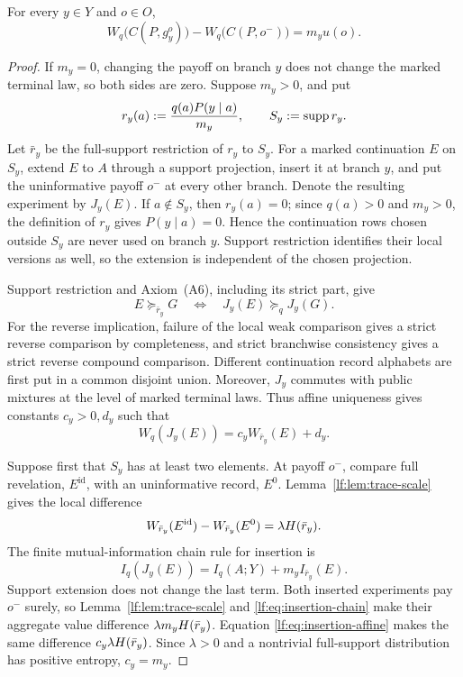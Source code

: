 \begin{lemma}\label{lf:lem:branch-increment}
For every $y\in Y$ and $o\in O$,
\begin{equation}
W_q\bigl(C(P,g_y^o)\bigr)
-W_q\bigl(C(P,o^-)\bigr)=m_y u(o).
\label{lf:eq:branch-increment}
\end{equation}
\end{lemma}

\begin{proof}
If $m_y=0$, changing the payoff on branch $y$ does not change the marked
terminal law, so both sides are zero.  Suppose $m_y>0$, and put
\[
r_y(a):=\frac{q(a)P(y\mid a)}{m_y},
\qquad
S_y:=\operatorname{supp} r_y.
\]
Let $\bar r_y$ be the full-support restriction of $r_y$ to $S_y$.  For a
marked continuation $E$ on $S_y$, extend $E$ to $A$ through a support
projection, insert it at branch $y$, and put the uninformative payoff $o^-$ at
every other branch.  Denote the resulting experiment by $J_y(E)$.  If
$a\notin S_y$, then $r_y(a)=0$; since $q(a)>0$ and $m_y>0$, the definition of
$r_y$ gives $P(y\mid a)=0$.  Hence the continuation rows chosen outside $S_y$
are never used on branch $y$.  Support restriction identifies their local
versions as well, so the extension is independent of the chosen projection.

Support restriction and Axiom~\textup{(A6)}, including its strict part, give
\[
E\succeq_{\bar r_y}G
\quad\Longleftrightarrow\quad
J_y(E)\succeq_q J_y(G).
\]
For the reverse implication, failure of the local weak comparison gives a
strict reverse comparison by completeness, and strict branchwise consistency
gives a strict reverse compound comparison.  Different continuation record
alphabets are first put in a common disjoint union.  Moreover, $J_y$ commutes
with public mixtures at the level of marked terminal laws.  Thus affine
uniqueness gives constants $c_y>0,d_y$ such that
\begin{equation}
W_q(J_y(E))=c_y W_{\bar r_y}(E)+d_y.
\label{lf:eq:insertion-affine}
\end{equation}

Suppose first that $S_y$ has at least two elements.  At payoff $o^-$, compare
full revelation, $E^{\mathrm{id}}$, with an uninformative record, $E^0$.
Lemma~\ref{lf:lem:trace-scale} gives the local difference
\[
W_{\bar r_y}(E^{\mathrm{id}})-W_{\bar r_y}(E^0)
=\lambda H(\bar r_y).
\]
The finite mutual-information chain rule for insertion is
\begin{equation}
I_q(J_y(E))=I_q(A;Y)+m_y I_{\bar r_y}(E).
\label{lf:eq:insertion-chain}
\end{equation}
Support extension does not change the last term.  Both inserted experiments
pay $o^-$ surely, so Lemma~\ref{lf:lem:trace-scale} and
\eqref{lf:eq:insertion-chain} make their aggregate value difference
$\lambda m_yH(\bar r_y)$.  Equation
\eqref{lf:eq:insertion-affine} makes the same difference
$c_y\lambda H(\bar r_y)$.  Since $\lambda>0$ and a nontrivial full-support
distribution has positive entropy, $c_y=m_y$.


\end{proof}
